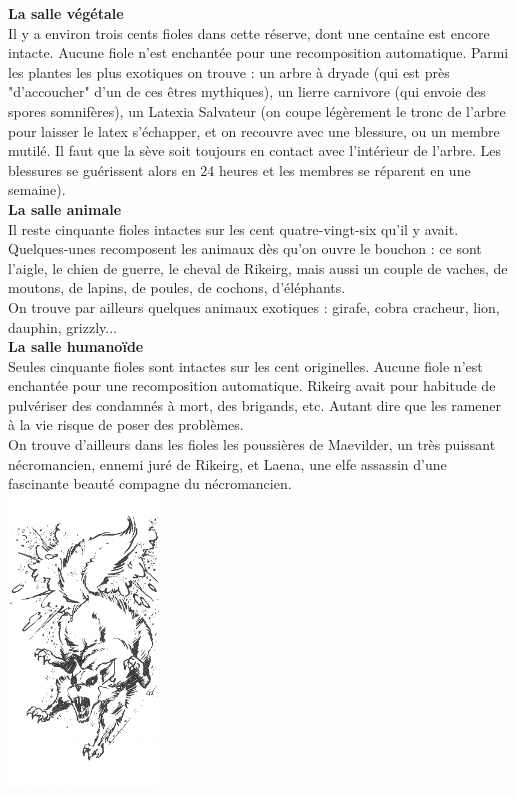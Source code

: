 \documentclass[11pt,twoside,a4paper]{article}
\begin{document}
\begin{multicols}{3}
{\textbf{La salle v{\'e}g{\'e}tale}~\\ 

Il y a environ trois cents fioles dans cette r{\'e}serve, dont une centaine est encore intacte. Aucune fiole n'est enchant{\'e}e pour une recomposition automatique. Parmi les plantes les plus exotiques on trouve : un arbre {\`a} dryade (qui est pr{\`e}s "d'accoucher" d'un de ces {\^e}tres mythiques), un lierre carnivore (qui envoie des spores somnif{\`e}res), un Latexia Salvateur (on coupe l{\'e}g{\`e}rement le tronc de l'arbre pour laisser le latex s'{\'e}chapper, et on recouvre avec une blessure, ou un membre mutil{\'e}. Il faut que la s{\`e}ve soit toujours en contact avec l'int{\'e}rieur de l'arbre. Les blessures se gu{\'e}rissent alors en 24 heures et les membres se r{\'e}parent en une semaine).~\\

\textbf{La salle animale}~\\

Il reste cinquante fioles intactes sur les cent quatre-vingt-six qu'il y avait. Quelques-unes recomposent les animaux d{\`e}s qu'on ouvre le bouchon : ce sont l'aigle, le chien de guerre, le cheval de Rikeirg, mais aussi un couple de vaches, de moutons, de lapins, de poules, de cochons, d'{\'e}l{\'e}phants.~\\

On trouve par ailleurs quelques animaux exotiques : girafe, cobra cracheur, lion, dauphin, grizzly...~\\

\textbf{La salle humano{\"i}de}~\\

Seules cinquante fioles sont intactes sur les cent originelles. Aucune fiole n'est enchant{\'e}e pour une recomposition automatique. Rikeirg avait pour habitude de pulv{\'e}riser des condamn{\'e}s {\`a} mort, des brigands, etc. Autant dire que les ramener {\`a} la vie risque de poser des probl{\`e}mes.~\\

On trouve d'ailleurs dans les fioles les poussi{\`e}res de Maevilder, un tr{\`e}s puissant n{\'e}cromancien, ennemi jur{\'e} de Rikeirg, et Laena, une elfe assassin d'une fascinante beaut{\'e} compagne du n{\'e}cromancien.~\\

\includegraphics[width=0.30\textwidth]{img/verteneRikeirg.jpg}

}
\end{multicols}
\end{document}
